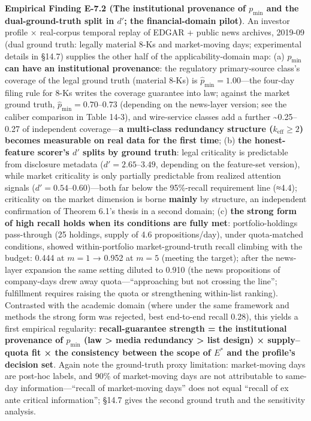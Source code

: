 \documentclass[
  11pt]{article}
\begin{document}
\textbf{Empirical Finding E-7.2 (The institutional provenance of
\(p_{\min}\) and the dual-ground-truth split in \(d'\); the
financial-domain pilot)}. An investor profile × real-corpus temporal
replay of EDGAR + public news archives, 2019-09 (dual ground truth:
legally material 8-Ks and market-moving days; experimental details in
§14.7) supplies the other half of the applicability-domain map: (a)
\textbf{\(p_{\min}\) can have an institutional provenance}: the
regulatory primary-source class's coverage of the legal ground truth
(material 8-Ks) is \(\hat p_{\min} = 1.00\)---the four-day filing rule
for 8-Ks writes the coverage guarantee into law; against the market
ground truth, \(\hat p_{\min}=0.70\)--\(0.73\) (depending on the
news-layer version; see the caliber comparison in Table 14-3), and
wire-service classes add a further \textasciitilde0.25--0.27 of
independent coverage---\textbf{a multi-class redundancy structure
(\(k_{\mathrm{eff}}\ge2\)) becomes measurable on real data for the first
time}; (b) \textbf{the honest-feature scorer's \(d'\) splits by ground
truth}: legal criticality is predictable from disclosure metadata
(\(d'=2.65\)--\(3.49\), depending on the feature-set version), while
market criticality is only partially predictable from realized attention
signals (\(d'=0.54\)--\(0.60\))---both far below the 95\%-recall
requirement line (≈4.4); criticality on the market dimension is borne
\textbf{mainly} by structure, an independent confirmation of Theorem
6.1's thesis in a second domain; (c) \textbf{the strong form of high
recall holds when its conditions are fully met}: portfolio-holdings
pass-through (25 holdings, supply of 4.6 propositions/day), under
quota-matched conditions, showed within-portfolio market-ground-truth
recall climbing with the budget: 0.444 at \(m=1\) → 0.952 at \(m=5\)
(meeting the target); after the news-layer expansion the same setting
diluted to 0.910 (the news propositions of company-days drew away
quota---``approaching but not crossing the line''; fulfillment requires
raising the quota or strengthening within-list ranking). Contrasted with
the academic domain (where under the same framework and methods the
strong form was rejected, best end-to-end recall 0.28), this yields a
first empirical regularity: \textbf{recall-guarantee strength = the
institutional provenance of \(p_{\min}\) (law \textgreater{} media
redundancy \textgreater{} list design) × supply--quota fit × the
consistency between the scope of \(E^*\) and the profile's decision
set}. Again note the ground-truth proxy limitation: market-moving days
are post-hoc labels, and 90\% of market-moving days are not attributable
to same-day information---``recall of market-moving days'' does not
equal ``recall of ex ante critical information''; §14.7 gives the second
ground truth and the sensitivity analysis.
\end{document}
